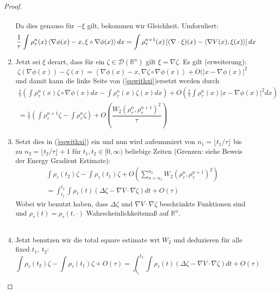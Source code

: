 \documentclass[11pt,a4paper,notitlepage]{scrreprt}
\newcommand{\RR}{\mathbb{R}}
\begin{document}
\begin{proof}
\begin{enumerate}
\begin{align*}
\end{align*}
Da dies genauso für $-\xi$ gilt, bekommen wir Gleichheit. Umforuliert:
\begin{equation}
\frac{1}{\tau} \int \rho_\tau^n(x)\left\langle\nabla\phi(x)-x,\xi\circ\nabla\phi(x)\right\rangle dx\\=\int\rho_\tau^{n+1}(x)\left[(\nabla\cdot \xi)(x)-\langle\nabla V(x),\xi(x)\rangle \right]dx \label{eqwithxi}
\end{equation}
\item Jetzt sei $\xi$ derart, dass für ein $\zeta\in\mathcal{D}(\RR^n)$ gilt $\xi=\nabla\zeta$. Es gilt (erweiterung):
\begin{equation}
\zeta(\nabla\phi(x))-\zeta(x)=\left\langle\nabla\phi(x)-x,\nabla\zeta\circ\nabla\phi(x)\right\rangle+O(\vert x-\nabla\phi(x)\vert^2
\end{equation}
und damit kann die linke Seite von (\ref{eqwithxi})ersetzt werden durch
\begin{align*}
\frac{1}{\tau}\left(\int \rho_\tau^n(x)\zeta\circ\nabla\phi(x)dx-\int\rho_\tau^n(x)\zeta(x)dx\right)+O\left(\frac{1}{\tau}\int\rho_\tau^n(x)\vert x-\nabla\phi(x)\vert^2dx\right)\\
=\frac{1}{\tau}\left(\int\rho_\tau^{n+1}\zeta-\int\rho_\tau^n\zeta\right)+O\left(\dfrac{W_2(\rho_\tau^n,\rho_\tau^{n+1})^2}{\tau}\right)
\end{align*}
\item Setzt dies in (\ref{eqwithxi}) ein und  nun wird aufsummiert  von $n_1=\lfloor t_1/\tau\rfloor$ bis zu $n_2=\lfloor t_2/\tau\rfloor+1$ für $t_1,t_2\in[0,\infty)$ beliebige Zeiten (Grenzen: siehe Beweis der Energy Gradient Estimate):
\begin{eqnarray}
\int\rho_\tau(t_2)\zeta-\int\rho_\tau(t_1)\zeta+O\left(\sum_{n=n_1}^{n_2}W_2(\rho_\tau^n,\rho_\tau^{n+1})^2\right)\\
=\int_{t_1}^{t_2}\int\rho_\tau(t)(\Delta\zeta-\nabla V\cdot\nabla\zeta)dt+O(\tau)
\end{eqnarray}
Wobei wir benutzt haben, dass $\Delta\zeta$ und $\nabla V\cdot\nabla\zeta$ beschränkte Funktionen sind und $\rho_\tau(t)=\rho_\tau(t,\cdot)$ Wahrscheinlichkeitsmaß auf $\RR^n$.\\\\
\item Jetzt benutzen wir die total square estimate wrt $W_2$ und deduzieren für alle fixed $t_1,~t_2$:
\begin{equation}
\int\rho_\tau(t_2)\zeta-\int\rho_\tau(t_1)\zeta+O(\tau)=\int_{t_1}^{t_2}\int\rho_\tau(t)(\Delta\zeta-\nabla V\cdot\nabla\zeta)dt+O(\tau)

\end{equation}
\end{enumerate}
\end{proof}
\end{document}
